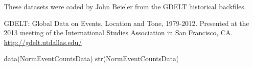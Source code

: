\documentclass[a4paper]{book}
\begin{document}
%
\begin{Source}\relax
These datasets were coded by John Beieler from the GDELT historical backfiles.
\end{Source}
%
\begin{References}\relax
GDELT: Global Data on Events, Location and Tone,
1979-2012. Presented at the 2013 meeting of the
International Studies Association in San Francisco, CA.
\url{http://gdelt.utdallas.edu/}
\end{References}
%
\begin{Examples}
\begin{ExampleCode}
data(NormEventCountsData)
str(NormEventCountsData)
\end{ExampleCode}
\end{Examples}
\printindex{}
\end{document}

